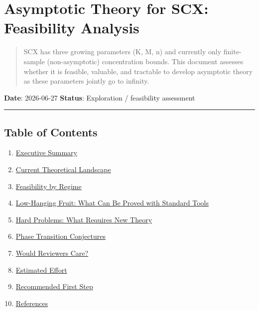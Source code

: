 \documentclass[
  12pt,
]{article}
\author{SCX}
\date{2026}
\providecommand{\tightlist}{%
  \setlength{\itemsep}{0pt}\setlength{\parskip}{0pt}}
\begin{document}
\section{Asymptotic Theory for SCX: Feasibility
Analysis}\label{asymptotic-theory-for-scx-feasibility-analysis}

\begin{quote}
SCX has three growing parameters (K, M, n) and currently only
finite-sample (non-asymptotic) concentration bounds. This document
assesses whether it is feasible, valuable, and tractable to develop
asymptotic theory as these parameters jointly go to infinity.
\end{quote}

\textbf{Date}: 2026-06-27 \textbf{Status}: Exploration / feasibility
assessment

\begin{center}\rule{0.5\linewidth}{0.5pt}\end{center}

\subsection{Table of Contents}\label{table-of-contents}

\begin{enumerate}
\def\labelenumi{\arabic{enumi}.}
\tightlist
\item
  \hyperref[1-executive-summary]{Executive Summary}
\item
  \hyperref[2-current-theoretical-landscape]{Current Theoretical
  Landscape}
\item
  \hyperref[3-feasibility-by-regime]{Feasibility by Regime}
\item
  \hyperref[4-low-hanging-fruit-what-can-be-proved-with-standard-tools]{Low-Hanging
  Fruit: What Can Be Proved with Standard Tools}
\item
  \hyperref[5-hard-problems-what-requires-new-theory]{Hard Problems:
  What Requires New Theory}
\item
  \hyperref[6-phase-transition-conjectures]{Phase Transition
  Conjectures}
\item
  \hyperref[7-would-reviewers-care]{Would Reviewers Care?}
\item
  \hyperref[8-estimated-effort]{Estimated Effort}
\item
  \hyperref[9-recommended-first-step]{Recommended First Step}
\item
  \hyperref[10-references]{References}
\end{enumerate}
\end{document}
